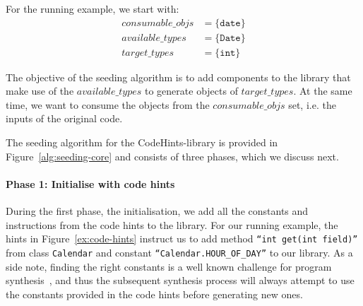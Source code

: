 \documentclass[sigconf,review,anonymous]{acmart}
\begin{document}
For the running example, we start with:
\[
\begin{aligned}
  consumable\_objs &=  \{\texttt{date}\}\\  
  available\_types &=  \{\texttt{Date}\}\\
  target\_types &= \{\texttt{int}\}
\end{aligned}
\]

%

The objective of the seeding algorithm is to
add components to the library that make use of the $available\_types$ to generate objects
of $target\_types$. At the same time, we want to consume the objects from the
$consumable\_objs$ set, i.e. the inputs of the original code.

The seeding algorithm for the CodeHints-library is provided in Figure~\ref{alg:seeding-core} and consists of three phases, which we discuss next.

\paragraph{{\bf Phase 1: Initialise with code hints}}
During the first phase, the initialisation, we add all the constants and instructions from the code hints to the library.
%
For our running example, the hints in Figure~\ref{ex:code-hints} %
instruct us to add method \texttt{``int get(int field)''} from class
\texttt{Calendar} and constant \texttt{``Calendar.HOUR\_OF\_DAY''} to our library.
As a side note, finding the right constants is a well known
challenge for program synthesis~\cite{DBLP:conf/cav/AbateDKKP18}, and thus the subsequent
synthesis process will always attempt to use the constants provided in the code hints before generating new ones.
\end{document}
